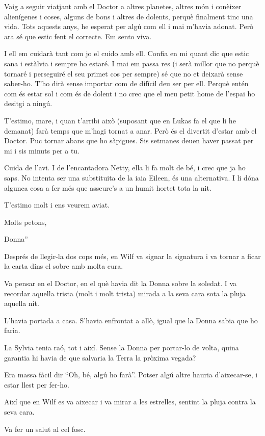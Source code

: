 Vaig a seguir viatjant amb el Doctor a altres planetes, altres món i
conèixer alienígenes i coses, alguns de bons i altres de dolents, perquè
finalment tinc una vida. Tots aquests anys, he esperat per algú com ell
i mai m'havia adonat. Però ara sé que estic fent el correcte. Em sento
viva.

I ell em cuidarà tant com jo el cuido amb ell. Confia en mi quant dic
que estic sana i estàlvia i sempre ho estaré. I mai em passa res (i serà
millor que no perquè tornaré i perseguiré el seu primet cos per sempre)
sé que no et deixarà sense saber-ho. T'ho dirà sense importar com de
difícil deu ser per ell. Perquè entén com és estar sol i com és de
dolent i no crec que el meu petit home de l'espai ho desitgi a ningú.

T'estimo, mare, i quan t'arribi això (suposant que en Lukas fa el que li
he demanat) farà temps que m'hagi tornat a anar. Però és el divertit
d'estar amb el Doctor. Puc tornar abans que ho sàpigues. Sis setmanes
deuen haver passat per mi i sis minuts per a tu.

Cuida de l'avi. I de l'encantadora Netty, ella li fa molt de bé, i crec
que ja ho saps. No intenta ser una substituita de la iaia Eileen, és una
alternativa. I li dóna algunca cosa a fer més que asseure's a un humit
hortet tota la nit.

T'estimo molt i ens veurem aviat.

Molts petons,

Donna''

Després de llegir-la dos cops més, en Wilf va signar la signatura i va
tornar a ficar la carta dins el sobre amb molta cura.

Va pensar en el Doctor, en el què havia dit la Donna sobre la soledat. I
va recordar aquella trista (molt i molt trista) mirada a la seva cara
sota la pluja aquella nit.

L'havia portada a casa. S'havia enfrontat a allò, igual que la Donna
sabia que ho faria.

La Sylvia tenia raó, tot i així. Sense la Donna per portar-lo de volta,
quina garantia hi havia de que salvaria la Terra la pròxima vegada?

Era massa fàcil dir ``Oh, bé, algú ho farà''. Potser algú altre hauria
d'aixecar-se, i estar llest per fer-ho.

Així que en Wilf es va aixecar i va mirar a les estrelles, sentint la
pluja contra la seva cara.

Va fer un salut al cel fosc.


